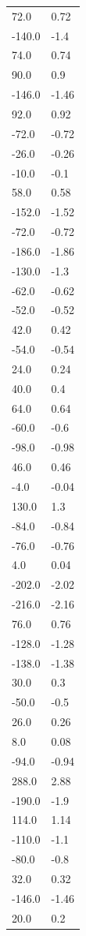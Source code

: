 \begin{longtable}{ll}
72.0 & 0.72 \\
-140.0 & -1.4 \\
74.0 & 0.74 \\
90.0 & 0.9 \\
-146.0 & -1.46 \\
92.0 & 0.92 \\
-72.0 & -0.72 \\
-26.0 & -0.26 \\
-10.0 & -0.1 \\
58.0 & 0.58 \\
-152.0 & -1.52 \\
-72.0 & -0.72 \\
-186.0 & -1.86 \\
-130.0 & -1.3 \\
-62.0 & -0.62 \\
-52.0 & -0.52 \\
42.0 & 0.42 \\
-54.0 & -0.54 \\
24.0 & 0.24 \\
40.0 & 0.4 \\
64.0 & 0.64 \\
-60.0 & -0.6 \\
-98.0 & -0.98 \\
46.0 & 0.46 \\
-4.0 & -0.04 \\
130.0 & 1.3 \\
-84.0 & -0.84 \\
-76.0 & -0.76 \\
4.0 & 0.04 \\
-202.0 & -2.02 \\
-216.0 & -2.16 \\
76.0 & 0.76 \\
-128.0 & -1.28 \\
-138.0 & -1.38 \\
30.0 & 0.3 \\
-50.0 & -0.5 \\
26.0 & 0.26 \\
8.0 & 0.08 \\
-94.0 & -0.94 \\
288.0 & 2.88 \\
-190.0 & -1.9 \\
114.0 & 1.14 \\
-110.0 & -1.1 \\
-80.0 & -0.8 \\
32.0 & 0.32 \\
-146.0 & -1.46 \\
20.0 & 0.2 \\

\end{longtable}
